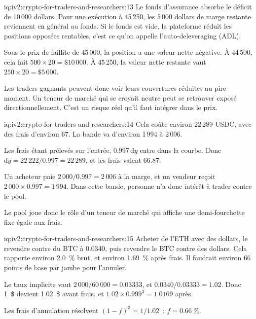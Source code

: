 \begin{solution}{iq:iv2:crypto-for-traders-and-researchers:13}
Le fonds d'assurance absorbe le déficit de 10\,000 dollars. Pour une exécution à 45\,250, les 5\,000 dollars de marge restante reviennent en général au fonds. Si le fonds est vide, la plateforme réduit les positions opposées rentables, c'est ce qu'on appelle l'auto-deleveraging (ADL).

Sous le prix de faillite de 45\,000, la position a une valeur nette négative. À 44\,500, cela fait $500 \times 20 = \$10\,000$. À 45\,250, la valeur nette restante vaut $250 \times 20 = \$5\,000$.

Les traders gagnants peuvent donc voir leurs couvertures réduites au pire moment. Un teneur de marché qui se croyait neutre peut se retrouver exposé directionnellement. C'est un risque réel qu'il faut intégrer dans le prix.

\end{solution}

\begin{solution}{iq:iv2:crypto-for-traders-and-researchers:14}
Cela coûte environ 22\,289 USDC, avec des frais d'environ 67. La bande va d'environ 1\,994 à 2\,006.

Les frais étant prélevés sur l'entrée, $0.997\,\mathrm{d}y$ entre dans la courbe. Donc $\mathrm{d}y = 22\,222/0.997 = 22\,289$, et les frais valent 66.87.

Un acheteur paie $2\,000/0.997 = 2\,006$ à la marge, et un vendeur reçoit $2\,000 \times 0.997 = 1\,994$. Dans cette bande, personne n'a donc intérêt à trader contre le pool.

Le pool joue donc le rôle d'un teneur de marché qui affiche une demi-fourchette fixe égale aux frais.

\end{solution}

\begin{solution}{iq:iv2:crypto-for-traders-and-researchers:15}
Acheter de l'ETH avec des dollars, le revendre contre du BTC à 0.0340, puis revendre le BTC contre des dollars. Cela rapporte environ 2.0~\% brut, et environ 1.69~\% après frais. Il faudrait environ 66 points de base par jambe pour l'annuler.

Le taux implicite vaut $2\,000/60\,000 = 0.03333$, et $0.0340/0.03333 = 1.02$. Donc 1~\$ devient 1.02~\$ avant frais, et $1.02 \times 0.999^3 = 1.0169$ après.

Les frais d'annulation résolvent $(1 - f)^3 = 1/1.02$~: $f = 0.66~\%$.

\end{solution}

